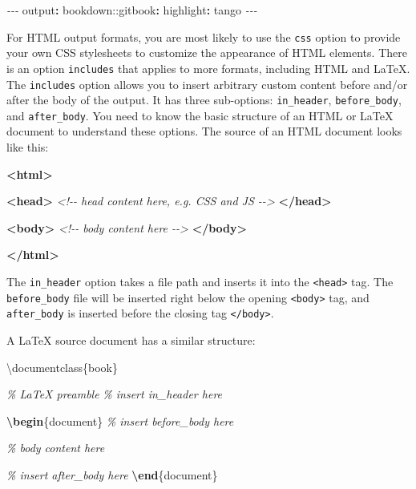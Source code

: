 \documentclass[
  12pt,
]{krantz}
\newenvironment{Shaded}{\begin{snugshade}}{\end{snugshade}}
\newcommand{\AttributeTok}[1]{\textcolor[rgb]{0.77,0.63,0.00}{#1}}
\newcommand{\BuiltInTok}[1]{#1}
\newcommand{\CommentTok}[1]{\textcolor[rgb]{0.56,0.35,0.01}{\textit{#1}}}
\newcommand{\ExtensionTok}[1]{#1}
\newcommand{\FunctionTok}[1]{\textcolor[rgb]{0.00,0.00,0.00}{#1}}
\newcommand{\KeywordTok}[1]{\textcolor[rgb]{0.13,0.29,0.53}{\textbf{#1}}}
\newcommand{\NormalTok}[1]{#1}
\newcommand{\PreprocessorTok}[1]{\textcolor[rgb]{0.56,0.35,0.01}{\textit{#1}}}
\theoremstyle{definition}
\theoremstyle{definition}
\theoremstyle{definition}
\theoremstyle{definition}
\theoremstyle{remark}
\begin{document}
\begin{Shaded}
\begin{Highlighting}[]
\PreprocessorTok{{-}{-}{-}}
\FunctionTok{output}\KeywordTok{:}
\AttributeTok{  bookdown:}\FunctionTok{:gitbook}\KeywordTok{:}
\AttributeTok{    }\FunctionTok{highlight}\KeywordTok{:}\AttributeTok{ tango}
\PreprocessorTok{{-}{-}{-}}
\end{Highlighting}
\end{Shaded}

For HTML output formats, you are most likely to use the \texttt{css} option to provide your own CSS stylesheets to customize the appearance of HTML elements. There is an option \texttt{includes} that applies to more formats, including HTML and LaTeX. The \texttt{includes} option allows you to insert arbitrary custom content before and/or after the body of the output. It has three sub-options: \texttt{in\_header}, \texttt{before\_body}, and \texttt{after\_body}. You need to know the basic structure of an HTML or LaTeX document to understand these options. The source of an HTML document looks like this:

\begin{Shaded}
\begin{Highlighting}[]
\KeywordTok{\textless{}html\textgreater{}}
  
  \KeywordTok{\textless{}head\textgreater{}}
  \CommentTok{\textless{}!{-}{-} head content here, e.g. CSS and JS {-}{-}\textgreater{}}
  \KeywordTok{\textless{}/head\textgreater{}}
  
  \KeywordTok{\textless{}body\textgreater{}}
  \CommentTok{\textless{}!{-}{-} body content here {-}{-}\textgreater{}}
  \KeywordTok{\textless{}/body\textgreater{}}

\KeywordTok{\textless{}/html\textgreater{}}
\end{Highlighting}
\end{Shaded}

The \texttt{in\_header} option takes a file path and inserts it into the \texttt{\textless{}head\textgreater{}} tag. The \texttt{before\_body} file will be inserted right below the opening \texttt{\textless{}body\textgreater{}} tag, and \texttt{after\_body} is inserted before the closing tag \texttt{\textless{}/body\textgreater{}}.

A LaTeX source document has a similar structure:

\begin{Shaded}
\begin{Highlighting}[]
\BuiltInTok{\textbackslash{}documentclass}\NormalTok{\{}\ExtensionTok{book}\NormalTok{\}}

\CommentTok{\% LaTeX preamble}
\CommentTok{\% insert in\_header here}

\KeywordTok{\textbackslash{}begin}\NormalTok{\{}\ExtensionTok{document}\NormalTok{\}}
\CommentTok{\% insert before\_body here}

\CommentTok{\% body content here}

\CommentTok{\% insert after\_body here}
\KeywordTok{\textbackslash{}end}\NormalTok{\{}\ExtensionTok{document}\NormalTok{\}}
\end{Highlighting}
\end{Shaded}
\end{document}
